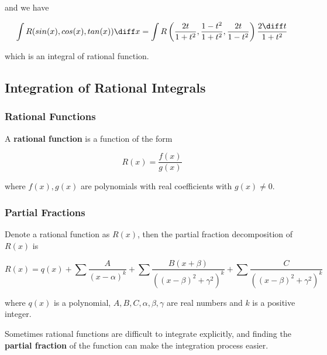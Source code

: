 and we have

$$\int R(sin(x),cos(x),tan(x))\diff x=\int R\left( \frac{2t}{1+t^{2}},\frac{1-t^{2}}{1+t^{2}},\frac{2t}{1-t^{2}}\right)\frac{2\diff t}{1+t^{2}}$$\s

which is an integral of rational function.

\subsection{Integration of Rational Integrals}
\subsubsection{Rational Functions}
\begin{dft}
  A \textbf{rational function} is a function of the form

  $$R(x)=\frac{f(x)}{g(x)}$$

  where $f(x),g(x)$ are polynomials with real coefficients with $g(x)\neq 0$.
\end{dft}

\subsubsection{Partial Fractions}
\begin{dft}
  Denote a rational function as $R(x)$, then the partial fraction decomposition of $R(x)$ is

  $$R(x)=q(x)+\sum\frac{A}{(x-\alpha)^{k}}+\sum\frac{B(x+\beta)}{((x-\beta)^{2}+\gamma^{2})^{k}}+\sum\frac{C}{((x-\beta)^{2}+\gamma^{2})^{k}}$$\s

  where $q(x)$ is a polynomial, $A,B,C,\alpha,\beta,\gamma$ are real numbers and $k$ is a positive integer.
\end{dft}\n

Sometimes rational functions are difficult to integrate explicitly, and finding the \textbf{partial fraction} of the function can make the integration process easier.\n

